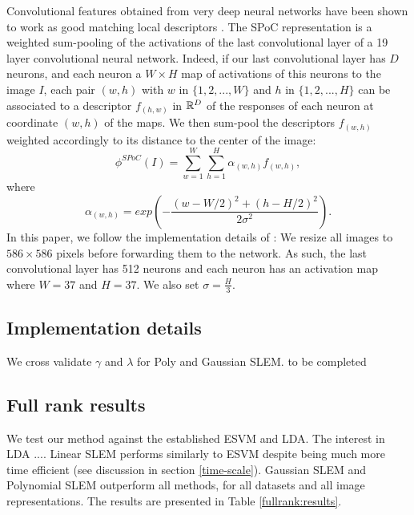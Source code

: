 Convolutional features obtained from very deep neural networks have been shown to work as good matching local descriptors \cite{SimonZisser15}. 
The SPoC representation \cite{babenko15} is a weighted sum-pooling of the activations of the last convolutional layer of a 19 layer convolutional neural network. 
Indeed, if our last convolutional layer has $D$ neurons, and each neuron a $W\times H$ map of activations of this neurons to the image $I$, 
each pair $(w,h)$ with $w$ in $\{1,2,..., W\}$ and $h$ in $\{1,2,...,H\}$ can be associated to a descriptor $f_{(h,w)}$ in $\mathbb R^D$ of the responses of each neuron at coordinate $(w,h)$ of the maps. 
We then sum-pool the descriptors $f_{(w,h)}$ weighted accordingly to its distance to the center of the image:
\begin{equation}
    \phi^{SPoC}(I) = \sum_{w=1}^W\sum_{h=1}^H \alpha_{(w,h)}f_{(w,h)},
\end{equation}
where
\begin{equation}
    \alpha_{(w,h)} = exp \left(-\dfrac{(w-W/2)^2+(h-H/2)^2}{2\sigma^2}\right).
\end{equation}
In this paper, we follow the implementation details of \cite{babenko15}: We resize all images to $586\times 586$ pixels before forwarding them to the network. As such, the last convolutional layer has 512 neurons and each neuron has an activation map where $W=37$ and $H=37$. We also set $\sigma=\frac{H}{3}$.

\subsection{Implementation details}
We cross validate $\gamma$ and $\lambda$ for Poly and Gaussian SLEM. to be completed


\subsection{Full rank results}
We test our method against the established ESVM and LDA. The interest in LDA ....
Linear SLEM performs similarly to ESVM despite being much more time efficient (see discussion in section \ref{time-scale}). Gaussian SLEM and Polynomial SLEM outperform all methods, for all datasets and all image representations. 
The results are presented in Table \ref{fullrank:results}.

